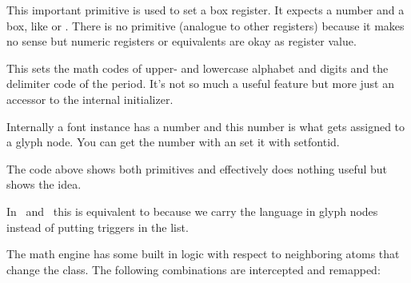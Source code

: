 \startlines \tttf \getbuffer \stoplines

\stopnewprimitive

\startoldprimitive[title={\prm {setbox}}]

This important primitive is used to set a box register. It expects a number and a
box, like  or . There is no \type {\boxdef} primitive
(analogue to other registers) because it makes no sense but numeric registers or
equivalents are okay as register value.

\stopoldprimitive

\startnewprimitive[title={\prm {setdefaultmathcodes}}]

This sets the math codes of upper- and lowercase alphabet and digits and the
delimiter code of the period. It's not so much a useful feature but more just an
accessor to the internal initializer.

\stopnewprimitive

\startnewprimitive[title={\prm {setfontid}}]

Internally a font instance has a number and this number is what gets assigned to
a glyph node. You can get the number with  an set it with \prm
{setfontid}.

\starttyping
\setfontid\fontid\font
\stoptyping

The code above shows both primitives and effectively does nothing useful but
shows the idea.

\stopnewprimitive

\startoldprimitive[title={\prm {setlanguage}}]

In \LUATEX\ and \LUAMETATEX\ this is equivalent to  because we
carry the language in glyph nodes instead of putting triggers in the list.

\stopoldprimitive

\startnewprimitive[title={\prm {setmathatomrule}}]

The math engine has some built in logic with respect to neighboring atoms that
change the class. The following combinations are intercepted and remapped:

